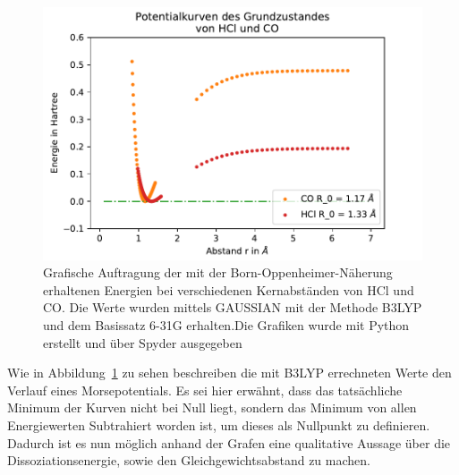 \begin{figure}[ht]
	\centering	
	\begin{minipage}{0.5\textwidth}
	\includegraphics[width=\columnwidth]{Bilder/b3lypzusammen}
	\end{minipage}
	
	
	\caption{Grafische Auftragung der mit der Born-Oppenheimer-Näherung erhaltenen Energien bei verschiedenen Kernabständen von HCl und CO. Die Werte wurden mittels GAUSSIAN mit der Methode B3LYP und dem Basissatz 6-31G erhalten.Die Grafiken wurde mit Python erstellt und über Spyder ausgegeben}
	
	
	\label{b3lypzusammen}
\end{figure}


Wie in Abbildung~\ref{b3lypzusammen} zu sehen beschreiben die mit B3LYP errechneten Werte den Verlauf eines Morsepotentials. Es sei hier erwähnt, dass das tatsächliche Minimum der Kurven nicht bei Null liegt, sondern das Minimum von allen Energiewerten Subtrahiert worden ist, um dieses als Nullpunkt zu definieren. Dadurch ist es nun möglich anhand der Grafen eine qualitative Aussage über die Dissoziationsenergie, sowie den Gleichgewichtsabstand zu machen.


  

